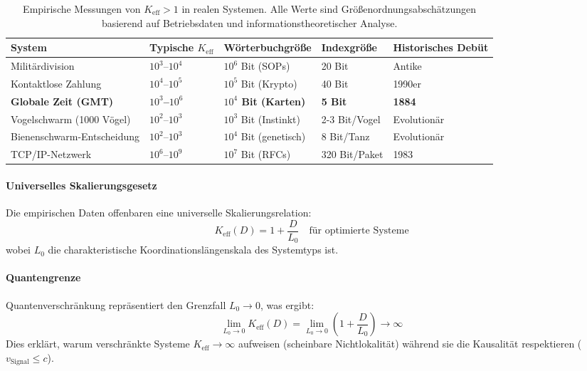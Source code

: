 \documentclass[11pt,a4paper]{article}
\begin{document}
	\begin{table}[htbp]
		\centering
		\small
		\begin{tabular}{p{}p{}p{}p{}p{}}
			\toprule
			\textbf{System} & \textbf{Typische $K_{\mathrm{eff}}$} & \textbf{Wörterbuchgröße} & \textbf{Indexgröße} & \textbf{Historisches Debüt} \\
			\midrule
			Militärdivision & $10^3$--$10^4$ & $10^6$ Bit (SOPs) & 20 Bit & Antike \\
			Kontaktlose Zahlung & $10^4$--$10^5$ & $10^5$ Bit (Krypto) & 40 Bit & 1990er \\
			\textbf{Globale Zeit (GMT)} & \textbf{$10^3$--$10^6$} & \textbf{$10^4$ Bit (Karten)} & \textbf{5 Bit} & \textbf{1884} \\
			Vogelschwarm (1000 Vögel) & $10^2$--$10^3$ & $10^3$ Bit (Instinkt) & 2-3 Bit/Vogel & Evolutionär \\
			Bienenschwarm-Entscheidung & $10^2$--$10^3$ & $10^4$ Bit (genetisch) & 8 Bit/Tanz & Evolutionär \\
			TCP/IP-Netzwerk & $10^6$--$10^9$ & $10^7$ Bit (RFCs) & 320 Bit/Paket & 1983 \\
			\bottomrule
		\end{tabular}
		\caption{Empirische Messungen von $K_{\mathrm{eff}} > 1$ in realen Systemen. Alle Werte sind Größenordnungsabschätzungen basierend auf Betriebsdaten und informationstheoretischer Analyse.}
		\label{tab:empirical-keff}
	\end{table}
	
	\paragraph{Universelles Skalierungsgesetz}
	Die empirischen Daten offenbaren eine universelle Skalierungsrelation:
	\begin{equation}
		\boxed{K_{\mathrm{eff}}(D) = 1 + \frac{D}{L_0} \quad \text{für optimierte Systeme}}
	\end{equation}
	wobei $L_0$ die charakteristische Koordinationslängenskala des Systemtyps ist.
	
	\paragraph{Quantengrenze}
	Quantenverschränkung repräsentiert den Grenzfall $L_0 \to 0$, was ergibt:
	\begin{equation}
		\lim_{L_0 \to 0} K_{\mathrm{eff}}(D) = \lim_{L_0 \to 0} \left(1 + \frac{D}{L_0}\right) \to \infty
	\end{equation}
	Dies erklärt, warum verschränkte Systeme $K_{\mathrm{eff}} \to \infty$ aufweisen (scheinbare Nichtlokalität) während sie die Kausalität respektieren ($v_{\text{Signal}} \leq c$).
	
\end{document}
